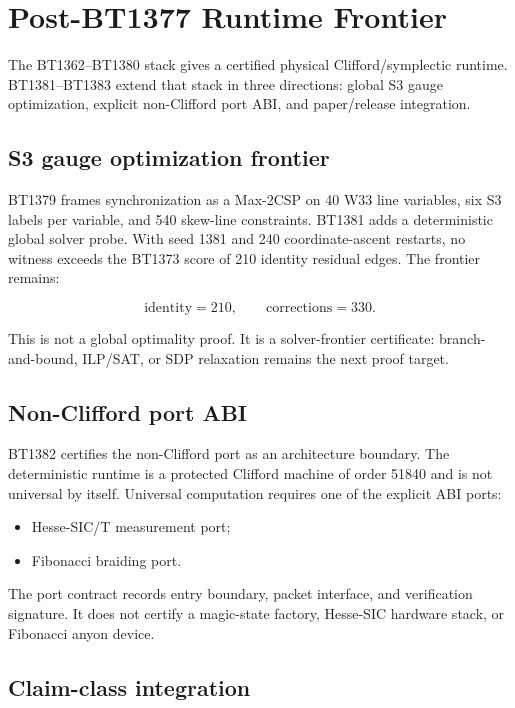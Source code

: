 \section{Post-BT1377 Runtime Frontier}

The BT1362--BT1380 stack gives a certified physical Clifford/symplectic runtime.  BT1381--BT1383 extend that stack in three directions: global S3 gauge optimization, explicit non-Clifford port ABI, and paper/release integration.

\subsection{S3 gauge optimization frontier}

BT1379 frames synchronization as a Max-2CSP on 40 W33 line variables, six S3 labels per variable, and 540 skew-line constraints.  BT1381 adds a deterministic global solver probe.  With seed 1381 and 240 coordinate-ascent restarts, no witness exceeds the BT1373 score of 210 identity residual edges.  The frontier remains:

\[
\mathrm{identity}=210,\qquad \mathrm{corrections}=330.
\]

This is not a global optimality proof.  It is a solver-frontier certificate: branch-and-bound, ILP/SAT, or SDP relaxation remains the next proof target.

\subsection{Non-Clifford port ABI}

BT1382 certifies the non-Clifford port as an architecture boundary.  The deterministic runtime is a protected Clifford machine of order 51840 and is not universal by itself.  Universal computation requires one of the explicit ABI ports:

\begin{itemize}
\item Hesse-SIC/T measurement port;
\item Fibonacci braiding port.
\end{itemize}

The port contract records entry boundary, packet interface, and verification signature.  It does not certify a magic-state factory, Hesse-SIC hardware stack, or Fibonacci anyon device.

\subsection{Claim-class integration}

